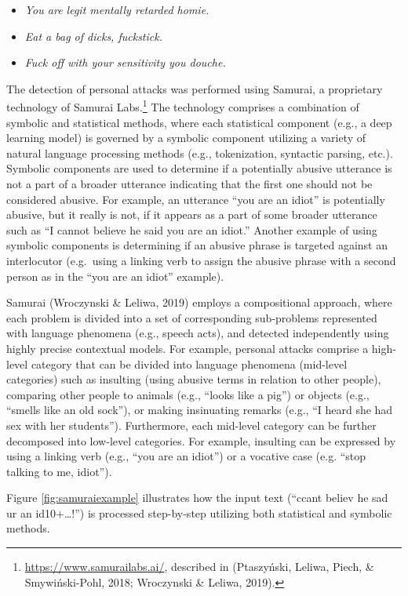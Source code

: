 \documentclass[10pt,dvipsnames]{scrartcl}
\begin{document}
\begin{itemize} 
\item \emph{You are legit mentally retarded homie.}
\item \emph {Eat a bag of dicks, fuckstick.}
\item \emph {Fuck off with your sensitivity you douche.} 
\end{itemize}

The detection of personal attacks was performed using Samurai, a
proprietary technology of Samurai Labs.\footnote{\url{https://www.samurailabs.ai/},
  described in (Ptaszyński, Leliwa, Piech, \& Smywiński-Pohl, 2018;
  Wroczynski \& Leliwa, 2019).} The technology comprises a combination
of symbolic and statistical methods, where each statistical component
(e.g., a deep learning model) is governed by a symbolic component
utilizing a variety of natural language processing methods (e.g.,
tokenization, syntactic parsing, etc.). Symbolic components are used to
determine if a potentially abusive utterance is not a part of a broader
utterance indicating that the first one should not be considered
abusive. For example, an utterance ``you are an idiot'' is potentially
abusive, but it really is not, if it appears as a part of some broader
utterance such as ``I cannot believe he said you are an idiot.'' Another
example of using symbolic components is determining if an abusive phrase
is targeted against an interlocutor (e.g.~using a linking verb to assign
the abusive phrase with a second person as in the ``you are an idiot''
example).

Samurai (Wroczynski \& Leliwa, 2019) employs a compositional approach,
where each problem is divided into a set of corresponding sub-problems
represented with language phenomena (e.g., speech acts), and detected
independently using highly precise contextual models. For example,
personal attacks comprise a high-level category that can be divided into
language phenomena (mid-level categories) such as insulting (using
abusive terms in relation to other people), comparing other people to
animals (e.g., ``looks like a pig'') or objects (e.g., ``smells like an
old sock''), or making insinuating remarks (e.g., ``I heard she had sex
with her students''). Furthermore, each mid-level category can be
further decomposed into low-level categories. For example, insulting can
be expressed by using a linking verb (e.g., ``you are an idiot'') or a
vocative case (e.g. ``stop talking to me, idiot'').

Figure \ref{fig:samuraiexample} illustrates how the input text (``ccant
believ he sad ur an id10+\ldots{}!'') is processed step-by-step
utilizing both statistical and symbolic methods.
\end{document}
